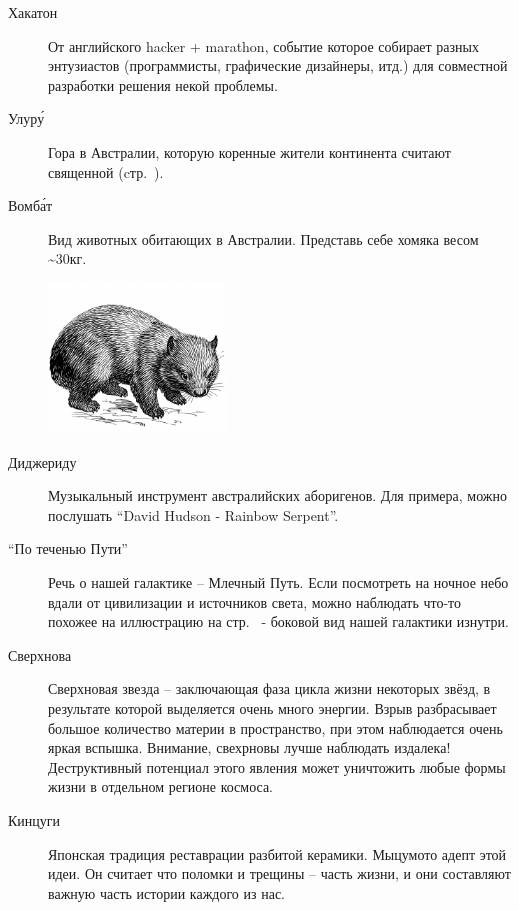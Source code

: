 \documentclass[14pt]{memoir}
\begin{document}
\begin{description}

\item[Хакатон] От английского hacker + marathon, событие которое собирает разных энтузиастов (программисты, графические дизайнеры, итд.) для совместной разработки решения некой проблемы. 

\item[Улур\'{у}] Гора в Австралии, которую коренные жители континента считают священной (cтр.~\pageref{uluru}).

\item[Вомб\'{а}т] Вид животных обитающих  в Австралии. Представь себе хомяка весом \textasciitilde30кг.
\begin{center}
\includegraphics[height=4cm]{images/wombat} 
\end{center}

\item[Диджериду] Музыкальный инструмент австралийских аборигенов. Для примера, можно послушать ``David Hudson - Rainbow Serpent''. 

\item[``По теченью Пути''] Речь о нашей галактике -- Млечный Путь. Если посмотреть на ночное небо вдали от цивилизации и источников света, можно наблюдать что-то похожее на иллюстрацию на стр.~\pageref{milky-way} - боковой вид нашей галактики изнутри.

\item[Сверхнова] Сверхновая звезда -- заключающая фаза цикла жизни некоторых звёзд, в результате которой выделяется очень много энергии. Взрыв разбрасывает большое количество материи в пространство, при этом наблюдается очень яркая вспышка. Внимание, свехрновы лучше наблюдать издалека! Деструктивный потенциал этого явления может уничтожить любые формы жизни в отдельном регионе космоса. 


\item[Кинцуги] Японская традиция реставрации разбитой керамики. Мыцумото адепт этой идеи. Он считает что поломки и трещины -- часть жизни, и они составляют важную часть истории каждого из нас.
\end{description}
\end{document}
